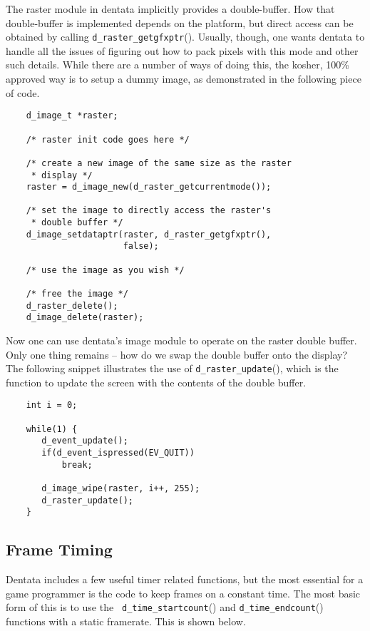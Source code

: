 The raster module in dentata implicitly provides a double-buffer. How
that double-buffer is implemented depends on the platform, but direct
access can be obtained by calling {\tt d\_raster\_getgfxptr}(). Usually,
though, one wants dentata to handle all the issues of figuring out how
to pack pixels with this mode and other such details. While there are a
number of ways of doing this, the kosher, 100\% approved way is to setup
a dummy image, as demonstrated in the following piece of code.

\begin{verbatim}
    d_image_t *raster;

    /* raster init code goes here */

    /* create a new image of the same size as the raster
     * display */
    raster = d_image_new(d_raster_getcurrentmode());

    /* set the image to directly access the raster's
     * double buffer */
    d_image_setdataptr(raster, d_raster_getgfxptr(),
                       false);

    /* use the image as you wish */

    /* free the image */
    d_raster_delete();
    d_image_delete(raster);
\end{verbatim}

Now one can use dentata's image module to operate on the raster
double buffer. Only one thing remains -- how do we swap the double
buffer onto the display? The following snippet illustrates the use
of {\tt d\_raster\_update}(), which is the function to update the
screen with the contents of the double buffer.

\begin{verbatim}
    int i = 0;

    while(1) {
       d_event_update();
       if(d_event_ispressed(EV_QUIT))
           break;

       d_image_wipe(raster, i++, 255);
       d_raster_update();
    }
\end{verbatim}

\subsection{Frame Timing}

Dentata includes a few useful timer related functions, but the most
essential for a game programmer is the code to keep frames on a
constant time. The most basic form of this is to use the {\tt
d\_time\_startcount}() and {\tt d\_time\_endcount}() functions with a
static framerate. This is shown below.

